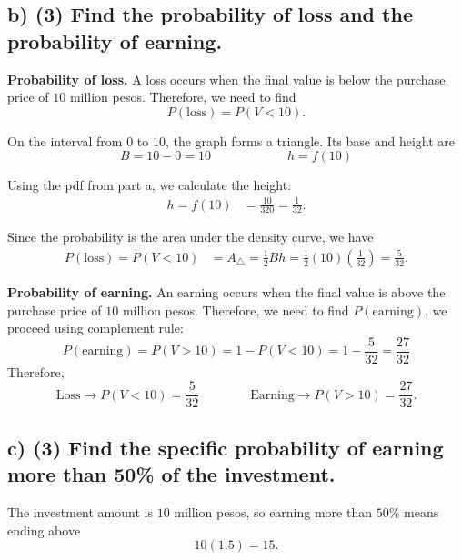 	
	\subsection*{b) \textbf{(3)} Find the probability of loss and the probability of earning.}
	\label{subsec:small-business-investment-c3-b}
	\textbf{Probability of loss.} A loss occurs when the final value is below the purchase price of $10$ million pesos. Therefore, we need to find
	\[
	P(\text{loss})=P(V<10).
	\]
	
	On the interval from $0$ to $10$, the graph forms a triangle. Its base and height are
	\[
	B=10-0=10
	\qquad \qquad \qquad
	h=f(10)
	\]
	
	Using the pdf from part a, we calculate the height:
	\[
	\begin{aligned}
		h=f(10)
		&=\frac{10}{320}
		=\frac{1}{32}.
	\end{aligned}
	\]
	
	Since the probability is the area under the density curve, we have
	\[
	\begin{aligned}
		P(\text{loss})=P(V<10)
		&=A_{\triangle}
		=\frac{1}{2}Bh
		=\frac{1}{2}(10)\left(\frac{1}{32}\right)
		=\frac{5}{32}.
	\end{aligned}
	\]
	
	\textbf{Probability of earning.} An earning occurs when the final value is above the purchase price of $10$ million pesos. Therefore, we need to find $P(\text{earning})$, we proceed using complement rule:
	\[
	P(\text{earning})=P(V>10)=1-P(V<10) =1-\frac{5}{32}
	=\frac{27}{32}
	\]
	Therefore,
	\[
	\text{Loss} \rightarrow P(V<10)=\frac{5}{32}
	\qquad\qquad
	\text{Earning} \rightarrow P(V>10)=\frac{27}{32}.
	\]
	
	
	
	\subsection*{c) \textbf{(3)} Find the specific probability of earning more than 50\% of the investment.}
	\label{subsec:small-business-investment-c3-c}
	The investment amount is $10$ million pesos, so earning more than $50\%$ means ending above
	\[
	10(1.5)=15.
	\]
	
